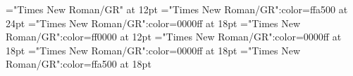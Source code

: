 \documentclass[a4paper]{article}
\begin{document}
\pagestyle{plain}
\sloppy
\setlength{\parfillskip}{0pt plus 1fil}
\font\main="Times New Roman/GR" at 12pt
\font\abcmain="Times New Roman/GR":color=ffa500 at 24pt
\font\amain="Times New Roman/GR":color=0000ff at 18pt
\font\bmain="Times New Roman/GR":color=ff0000 at 12pt
\font\abenmain="Times New Roman/GR":color=0000ff at 18pt
\font\abmain="Times New Roman/GR":color=0000ff at 18pt
\font\acmain="Times New Roman/GR":color=ffa500 at 18pt

\mbox{} 
\newpage 
\newpage 
\setcounter{page}{1} 
\pagestyle{fancy} 






\end{document}
